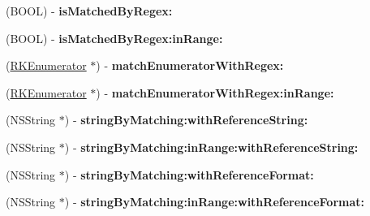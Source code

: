 \begin{DoxyCompactItemize}
\item 
\hypertarget{interface_n_s_string_07_regex_kit_additions_08_a9952639a4adaf1eb356ff7e79bb5284a}{(B\-O\-O\-L) -\/ {\bfseries is\-Matched\-By\-Regex\-:}}\label{interface_n_s_string_07_regex_kit_additions_08_a9952639a4adaf1eb356ff7e79bb5284a}

\item 
\hypertarget{interface_n_s_string_07_regex_kit_additions_08_af63fbeef87f84d36f86a653997df75b1}{(B\-O\-O\-L) -\/ {\bfseries is\-Matched\-By\-Regex\-:in\-Range\-:}}\label{interface_n_s_string_07_regex_kit_additions_08_af63fbeef87f84d36f86a653997df75b1}

\item 
\hypertarget{interface_n_s_string_07_regex_kit_additions_08_ac67a8e1a903ec7b57f3bf787df94f2ae}{(\hyperlink{interface_r_k_enumerator}{R\-K\-Enumerator} $\ast$) -\/ {\bfseries match\-Enumerator\-With\-Regex\-:}}\label{interface_n_s_string_07_regex_kit_additions_08_ac67a8e1a903ec7b57f3bf787df94f2ae}

\item 
\hypertarget{interface_n_s_string_07_regex_kit_additions_08_ace35946c116b64d5c3df42569cd2c05e}{(\hyperlink{interface_r_k_enumerator}{R\-K\-Enumerator} $\ast$) -\/ {\bfseries match\-Enumerator\-With\-Regex\-:in\-Range\-:}}\label{interface_n_s_string_07_regex_kit_additions_08_ace35946c116b64d5c3df42569cd2c05e}

\item 
\hypertarget{interface_n_s_string_07_regex_kit_additions_08_a9ac271d2875ed1472607d100c81761aa}{(N\-S\-String $\ast$) -\/ {\bfseries string\-By\-Matching\-:with\-Reference\-String\-:}}\label{interface_n_s_string_07_regex_kit_additions_08_a9ac271d2875ed1472607d100c81761aa}

\item 
\hypertarget{interface_n_s_string_07_regex_kit_additions_08_a1c367a696d5073151797a6aa5e123d01}{(N\-S\-String $\ast$) -\/ {\bfseries string\-By\-Matching\-:in\-Range\-:with\-Reference\-String\-:}}\label{interface_n_s_string_07_regex_kit_additions_08_a1c367a696d5073151797a6aa5e123d01}

\item 
\hypertarget{interface_n_s_string_07_regex_kit_additions_08_a1f6e91c871bed898c611b44b3b9d29ed}{(N\-S\-String $\ast$) -\/ {\bfseries string\-By\-Matching\-:with\-Reference\-Format\-:}}\label{interface_n_s_string_07_regex_kit_additions_08_a1f6e91c871bed898c611b44b3b9d29ed}

\item 
\hypertarget{interface_n_s_string_07_regex_kit_additions_08_a741544365f57cacb163e3956e43b2a20}{(N\-S\-String $\ast$) -\/ {\bfseries string\-By\-Matching\-:in\-Range\-:with\-Reference\-Format\-:}}\label{interface_n_s_string_07_regex_kit_additions_08_a741544365f57cacb163e3956e43b2a20}


\end{DoxyCompactItemize}
